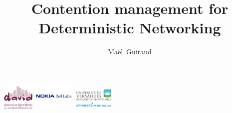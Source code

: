 \documentclass[10 pt]{beamer}
\title{Contention management for Deterministic Networking}
\author{Maël~Guiraud}
\institute[Nokia Bell Labs, DAVID-UVSQ] 
{
  DAVID, Universit\'e de Versailles Saint Quentin -
  Nokia Bell Labs France \\
}
\begin{document}
\begin{frame}

  \titlepage
  \centering
  \includegraphics [width=15mm]{logod.png} \hspace{1cm} \includegraphics [width=20mm]{logon.png} \hspace{1cm} \includegraphics [width=20mm]{logo.png} \\
\end{frame}
\end{document}
